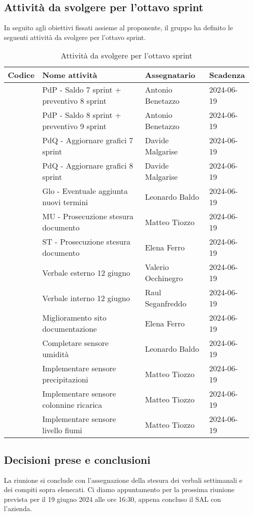 \documentclass[italian,12pt]{article}
\begin{document}
\newpage

\subsection{Attività da svolgere per l'ottavo sprint}
In seguito agli obiettivi fissati assieme al proponente, il gruppo ha definito le seguenti attività da svolgere per l'ottavo sprint.

\begin{table}[!h]
	\centering
	\begin{tabular}{ |l||p{7cm}|l|l| }
		\hline
		\textbf{Codice}    & \textbf{Nome attività}                     & \textbf{Assegnatario} & \textbf{Scadenza} \\
		\hline
		\mySkip[86bz7hfxp] & PdP - Saldo 7 sprint + preventivo 8 sprint & Antonio Benetazzo     & 2024-06-19 \\
		\mySkip[86bz8e6c7] & PdP - Saldo 8 sprint + preventivo 9 sprint & Antonio Benetazzo     & 2024-06-19 \\
		\mySkip[86bz7hfyc] & PdQ - Aggiornare grafici 7 sprint          & Davide Malgarise      & 2024-06-19 \\
		\mySkip[86bz8e48h] & PdQ - Aggiornare grafici 8 sprint          & Davide Malgarise      & 2024-06-19 \\
		\mySkip[86bz8e8fx] & Glo - Eventuale aggiunta nuovi termini     & Leonardo Baldo        & 2024-06-19 \\
		\mySkip[86bz7hg4z] & MU - Prosecuzione stesura documento        & Matteo Tiozzo         & 2024-06-19 \\
		\mySkip[86bz7hg4d] & ST - Prosecuzione stesura documento        & Elena Ferro           & 2024-06-19 \\
		\mySkip[86bz7hftu] & Verbale esterno 12 giugno                  & Valerio Occhinegro    & 2024-06-19 \\
		\mySkip[86bz7hfu3] & Verbale interno 12 giugno                  & Raul Seganfreddo      & 2024-06-19 \\
		\mySkip[86bz8dwn3] & Miglioramento sito documentazione          & Elena Ferro           & 2024-06-19 \\
		\mySkip[86bz7hfte] & Completare sensore umidità                 & Leonardo Baldo        & 2024-06-19 \\
		\mySkip[86bz8dufz] & Implementare sensore precipitazioni        & Matteo Tiozzo         & 2024-06-19 \\
		\mySkip[86bz8duk3] & Implementare sensore colonnine ricarica    & Matteo Tiozzo         & 2024-06-19 \\
		\mySkip[86bz8dwdy] & Implementare sensore livello fiumi         & Matteo Tiozzo         & 2024-06-19 \\
		\hline
	\end{tabular}
	\caption{Attività da svolgere per l'ottavo sprint}
\end{table}

\subsection{Decisioni prese e conclusioni}
La riunione si conclude con l'assegnazione della stesura dei verbali settimanali e dei compiti sopra elenecati. Ci diamo appuntamento per la prossima riunione prevista per il 19 giugno 2024 alle ore 16:30, appena concluso il SAL con l'azienda.
\end{document}
